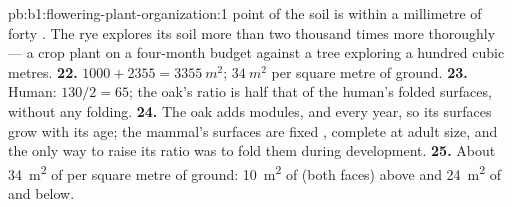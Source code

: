 \begin{solution}{pb:b1:flowering-plant-organization:1}
point of the soil is within a millimetre of forty . The rye
explores its soil more than two thousand times more thoroughly ---
a crop plant on a four-month budget against a tree exploring a hundred
cubic metres.
\textbf{22.} $1000 + 2355 = \qty{3355}{m^2}$; $\qty{34}{m^2}$ per
square metre of ground.
\textbf{23.} Human: $130/2 = 65$; the oak's ratio is half that of the
human's folded surfaces, without any folding.
\textbf{24.} The oak adds modules,  and  every year, so its
surfaces grow with its age; the mammal's surfaces are fixed ,
complete at adult size, and the only way to raise its ratio was to fold
them during development.
\textbf{25.} About \qty{34}{m^2} of  per square metre
of ground: \qty{10}{m^2} of  (both faces) above and \qty{24}{m^2}
of  and  below.
\end{solution}
